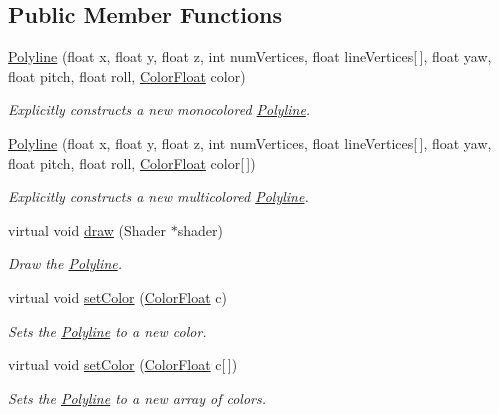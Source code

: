 \subsection*{Public Member Functions}
\begin{DoxyCompactItemize}
\item 
\hyperlink{classtsgl_1_1_polyline_ac5e95d665ce0b33415bcc8cc795a9bdd}{Polyline} (float x, float y, float z, int num\+Vertices, float line\+Vertices\mbox{[}$\,$\mbox{]}, float yaw, float pitch, float roll, \hyperlink{structtsgl_1_1_color_float}{Color\+Float} color)
\begin{DoxyCompactList}\small\item\em Explicitly constructs a new monocolored \hyperlink{classtsgl_1_1_polyline}{Polyline}. \end{DoxyCompactList}\item 
\hyperlink{classtsgl_1_1_polyline_afcdda0840f85221c0928eaf9424d411c}{Polyline} (float x, float y, float z, int num\+Vertices, float line\+Vertices\mbox{[}$\,$\mbox{]}, float yaw, float pitch, float roll, \hyperlink{structtsgl_1_1_color_float}{Color\+Float} color\mbox{[}$\,$\mbox{]})
\begin{DoxyCompactList}\small\item\em Explicitly constructs a new multicolored \hyperlink{classtsgl_1_1_polyline}{Polyline}. \end{DoxyCompactList}\item 
virtual void \hyperlink{classtsgl_1_1_polyline_a5d6b8876dd3c9cd47ebf837f3a7323f9}{draw} (Shader $\ast$shader)
\begin{DoxyCompactList}\small\item\em Draw the \hyperlink{classtsgl_1_1_polyline}{Polyline}. \end{DoxyCompactList}\item 
virtual void \hyperlink{classtsgl_1_1_polyline_af1fcca9f50c04186eda2a82874785dfd}{set\+Color} (\hyperlink{structtsgl_1_1_color_float}{Color\+Float} c)
\begin{DoxyCompactList}\small\item\em Sets the \hyperlink{classtsgl_1_1_polyline}{Polyline} to a new color. \end{DoxyCompactList}\item 
virtual void \hyperlink{classtsgl_1_1_polyline_a0e9bdf0fc4fb9e63e17e5ba1ced0d9b8}{set\+Color} (\hyperlink{structtsgl_1_1_color_float}{Color\+Float} c\mbox{[}$\,$\mbox{]})
\begin{DoxyCompactList}\small\item\em Sets the \hyperlink{classtsgl_1_1_polyline}{Polyline} to a new array of colors. \end{DoxyCompactList}\item 

\end{DoxyCompactItemize}
